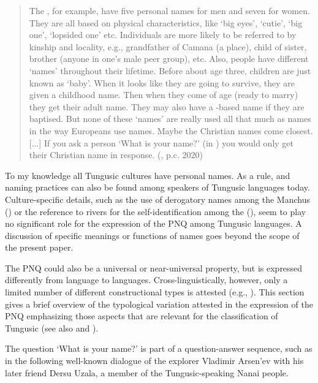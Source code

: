 \documentclass[output=paper,colorlinks,citecolor=brown]{langscibook}
\begin{document}
\begin{quote}
    The , for example, have five personal names for men and seven for women. They are all based on physical characteristics, like ‘big eyes’, ‘cutie’, ‘big one’, ‘lopsided one’ etc. Individuals are more likely to be referred to by kinship and locality, e.g., grandfather of Camana (a place), child of sister, brother (anyone in one’s male peer group), etc. Also, people have different ‘names’ throughout their lifetime. Before about age three, children are just known as ‘baby’. When it looks like they are going to survive, they are given a childhood name. Then when they come of age (ready to marry) they get their adult name. They may also have a -based name if they are baptised. But none of these ‘names’ are really used all that much as names in the way Europeans use names. Maybe the Christian names come closest. [...] If you ask a  person ‘What is your name?’ (in ) you would only get their Christian name in response. (, p.c. 2020)
\end{quote}

\noindent To my knowledge all Tungusic cultures have personal names. As a rule,  and  naming practices can also be found among speakers of Tungusic languages today. Culture-specific details, such as the use of derogatory names among the Manchus (\citealt{Alonso2012}) or the reference to rivers for the self-identification among the  (\citealt{Lavrillier2006}), seem to play no significant role for the expression of the PNQ among Tungusic languages. A discussion of specific meanings or functions of names goes beyond the scope of the present paper.

The PNQ could also be a universal or near-universal property, but is expressed differently from language to languages. Cross-linguistically, however, only a limited number of different constructional types is attested (e.g., \citealt[63–67]{Idiatov2007}). This section gives a brief overview of the typological variation attested in the expression of the PNQ emphasizing those aspects that are relevant for the classification of Tungusic (see also \citealt{Idiatov2007} and \citealt{Gil2018}).

The question ‘What is your name?’ is part of a question-answer sequence, such as in the following well-known  dialogue of the explorer Vladimir Arsen'ev with his later friend Dersu Uzala, a member of the Tungusic-speaking Nanai people.
\end{document}
